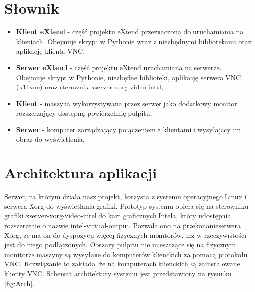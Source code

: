 


\subtitle{Dokumentacja techniczna}
\maketitle

\tableofcontents
\vfill
\pagebreak

\section{Słownik}

  \begin{itemize}
    \item \textbf{Klient eXtend} - część projektu eXtend przeznaczona do uruchamiania na klientach. Obejmuje skrypt w Pythonie wraz z niezbędnymi bibliotekami oraz aplikację klienta VNC,
    \item \textbf{Serwer eXtend} - część projektu eXtend uruchamiana na serwerze. Obejmuje skrypt w Pythonie, niezbędne biblioteki, aplikację serwera VNC (x11vnc) oraz sterownik xserver-xorg-video-intel,
    \item \textbf{Klient} - maszyna wykorzystywana przez serwer jako dodatkowy monitor rozszerzający dostępną powierzchnię pulpitu,
    \item \textbf{Serwer} - komputer zarządzający połączeniem z klientami i wysyłający im obraz do wyświetlenia.
  \end{itemize}

\section{Architektura aplikacji}


  Serwer, na którym działa nasz projekt, korzysta z systemu operacyjnego Linux i serwera Xorg do wyświetlania grafiki. Prototyp systemu opiera się na sterowniku grafiki xserver-xorg-video-intel do kart graficznych Intela, który udostępnia rozszerzenie o nazwie intel-virtual-output. Pozwala ono na \"przekonanie\" serwera Xorg, że ma on do dyspozycji więcej fizycznych monitorów, niż w rzeczywistości jest do niego podłączonych. Obszary pulpitu nie mieszczące się na fizycznym monitorze maszyny są wysyłane do komputerów klienckich za pomocą protokołu VNC. Rozwiązanie to zakłada, że na komputerach klienckich są zainstalowane klienty VNC. Schemat architektury systemu jest przedstawiony na rysunku \ref{fig:Arch}.

